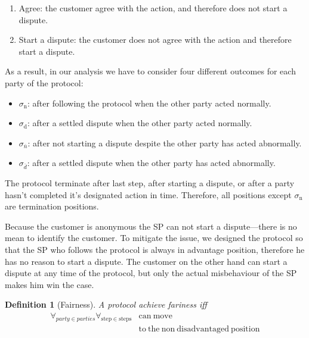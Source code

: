 \documentclass{ieeeaccess}
\newtheorem{definition}{Definition}
\begin{document}
\begin{enumerate}
\def\labelenumi{\arabic{enumi}.}

\item
  Agree: the customer agree with the action, and therefore does not start a dispute.
\item
  Start a dispute: the customer does not agree with the action and therefore start a dispute.
\end{enumerate}

As a result, in our analysis we have to consider four different outcomes for each party of the protocol:

\begin{itemize}

\item
  $\sigma_\mathrm{n}$: after following the protocol when the other party acted normally.
\item
  $\sigma_\mathrm{d}$: after a settled dispute when the other party acted normally.
\item
  $\sigma_\overline{n}$: after not starting a dispute despite the other party has acted abnormally.
\item
  $\sigma_\overline{d}$: after a settled dispute when the other party has acted abnormally.
\end{itemize}

The protocol terminate after last step, after starting a dispute, or after a party hasn't completed it's designated action in time. Therefore, all positions except $\sigma_\mathrm{n}$ are termination positions.

Because the customer is anonymous the SP can not start a dispute---there is no mean to identify the customer. To mitigate the issue, we designed the protocol so that the SP who follows the protocol is always in advantage position, therefore he has no reason to start a dispute. The customer on the other hand can start a dispute at any time of the protocol, but only the actual misbehaviour of the SP makes him win the case.

\begin{definition}[Fairness] \label{fairness}
A protocol achieve fariness iff 
\begin{equation*}
\begin{split}
\forall_{party \in parties}\forall_{\mathrm{step} \in \mathrm{steps}} &\mathrm{can\ move}\\
&\mathrm{to\ the\ non\ disadvantaged\ position} 
\end{split}
\end{equation*}

\end{definition}
\end{document}
